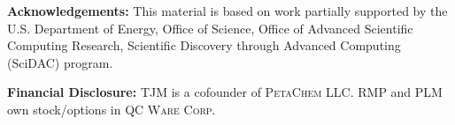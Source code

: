 \documentclass[aps,prl,twocolumn,showpacs,superscriptaddress,groupedaddress]{revtex4}  %
\begin{document}
\textbf{Acknowledgements:} This material is based on work partially supported by
the U.S. Department of Energy, Office of Science, Office of Advanced Scientific
Computing Research, Scientific Discovery through Advanced Computing (SciDAC)
program.

\textbf{Financial Disclosure:} TJM is a cofounder of \textsc{PetaChem LLC}.
RMP and PLM own stock/options in \textsc{QC Ware Corp.}

\end{document}
